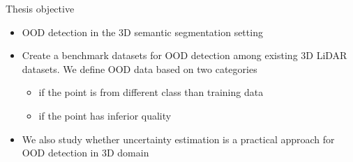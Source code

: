 \documentclass[aspectratio=169]{beamer}
\begin{document}
\begin{frame}{Thesis objective}

\begin{itemize}
    \item OOD detection in the 3D semantic segmentation setting
    \item Create a benchmark datasets for OOD detection among existing 3D LiDAR datasets. We define OOD data based on two categories
    \begin{itemize}
        \item if the point is from different class than training data
        \item if the point has inferior quality
    \end{itemize}
    \item We also study whether uncertainty estimation is a practical approach for OOD detection in 3D domain
\end{itemize}
    
\end{frame}
\end{document}
